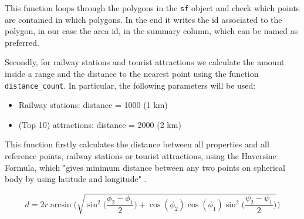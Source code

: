 This function loops through the polygons in the \texttt{sf} object and check which points are contained in which polygons. In the end it writes the id associated to the polygon, in our case the area id, in the summary column, which can be named as preferred.

Secondly, for railway stations and tourist attractions we calculate the amount inside a range and the distance to the nearest point using the function \texttt{distance\_count}. In particular, the following parameters will be used:

\begin{itemize}

    \item Railway stations: distance = 1000 (1 km)

    \item (Top 10) attractions: distance = 2000 (2 km)
    
\end{itemize}



This function firstly calculates the distance between all properties and all reference points, railway stations or tourist attractions, using the Haversine Formula, which "gives  minimum  distance  between  any  two  points  on  spherical body by using latitude and longitude" \citep{haversine:2013}.

\begin{equation}
d = 2r \arcsin \Bigg(\sqrt{\sin^2\Big(\frac{\phi_2 - \phi_1}{2}\Big) + \cos(\phi_2)\cos(\phi_1)\sin^2\Big(\frac{\psi_2 - \psi_1}{2}\Big)}\Bigg)
\end{equation}




\iffalse

